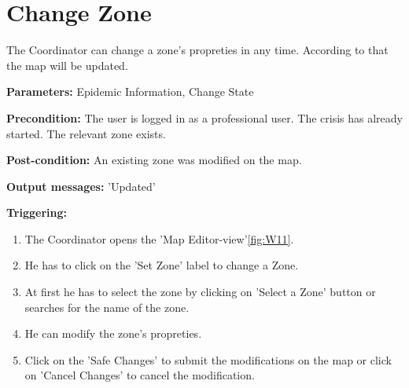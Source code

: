\section{Change Zone}
\label{operation:ChangeZone}
The Coordinator can change a zone's propreties in any time. According
to that the map will be updated.\\
\begin{description}
\item \textbf{Parameters:} Epidemic Information, Change State
\item \textbf{Precondition:} The user is logged in as a professional user. The
crisis has already started. The relevant zone exists.
\item \textbf{Post-condition:} An existing zone was modified on the map.
\item \textbf{Output messages:} 'Updated'
\item \textbf{Triggering:}
\begin{enumerate}
\item The Coordinator opens the 'Map Editor-view'\ref{fig:W11}.
\item He has to click on the 'Set Zone' label to change a Zone.
\item At first he has to select the zone by clicking on 'Select a Zone' button
or searches for the name of the zone.
\item He can modify the zone's propreties.
\item Click on the 'Safe Changes' to submit the modifications
on the map or click on 'Cancel Changes' to cancel the modification.
\end{enumerate}
\end{description} 

